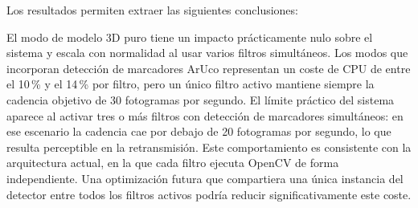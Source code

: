 Los resultados permiten extraer las siguientes conclusiones:

El modo de modelo 3D puro tiene un impacto prácticamente nulo sobre el sistema y escala con normalidad al usar varios filtros simultáneos. Los modos que incorporan detección de marcadores ArUco representan un coste de CPU de entre el 10\,\% y el 14\,\% por filtro, pero un único filtro activo mantiene siempre la cadencia objetivo de 30 fotogramas por segundo. El límite práctico del sistema aparece al activar tres o más filtros con detección de marcadores simultáneos: en ese escenario la cadencia cae por debajo de 20 fotogramas por segundo, lo que resulta perceptible en la retransmisión. Este comportamiento es consistente con la arquitectura actual, en la que cada filtro ejecuta OpenCV de forma independiente. Una optimización futura que compartiera una única instancia del detector entre todos los filtros activos podría reducir significativamente este coste.
